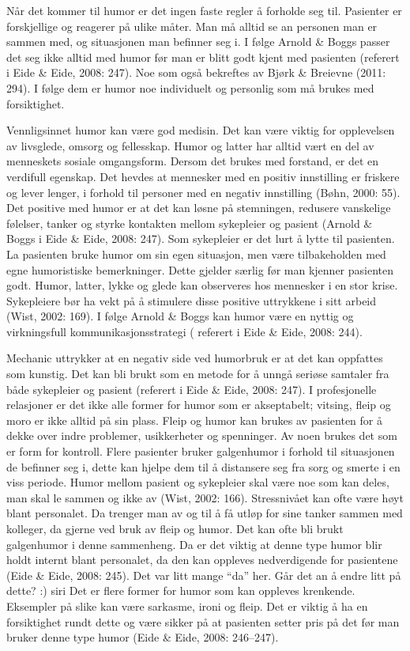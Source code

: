 Når det kommer til humor er det ingen faste regler å forholde seg til.
Pasienter er forskjellige og reagerer på ulike måter. Man må alltid se an
personen man er sammen med, og situasjonen man befinner seg i. I følge Arnold
\&{} Boggs passer det seg ikke alltid med humor før man er blitt godt kjent med
pasienten (referert i Eide \&{} Eide, 2008: 247). Noe som også bekreftes av Bjørk
\&{} Breievne (2011: 294). I følge dem er humor noe individuelt og personlig som
må brukes med forsiktighet.

Vennligsinnet humor kan være god medisin. Det kan være viktig for opplevelsen
av livsglede, omsorg og fellesskap. Humor og latter har alltid vært en del av
menneskets sosiale omgangsform. Dersom det brukes med forstand, er det en
verdifull egenskap. Det hevdes at mennesker med en positiv innstilling er
friskere og lever lenger, i forhold til personer med en negativ innstilling
(Bøhn, 2000: 55). Det positive med humor er at det kan løsne på stemningen,
redusere vanskelige følelser, tanker og styrke kontakten mellom sykepleier og
pasient (Arnold \&{} Boggs i Eide \&{} Eide, 2008: 247). Som sykepleier er det lurt å
lytte til pasienten. La pasienten bruke humor om sin egen situasjon, men være
tilbakeholden med egne humoristiske bemerkninger. Dette gjelder særlig før man
kjenner pasienten godt. Humor, latter, lykke og glede kan observeres hos
mennesker i en stor krise. Sykepleiere bør ha vekt på å stimulere disse
positive uttrykkene i sitt arbeid (Wist, 2002: 169). I følge Arnold \&{} Boggs kan
humor være en nyttig og virkningsfull kommunikasjonsstrategi ( referert i Eide
\&{} Eide, 2008: 244).

Mechanic uttrykker at en negativ side ved humorbruk er at det kan oppfattes som
kunstig. Det kan bli brukt som en metode for å unngå seriøse samtaler fra både
sykepleier og pasient (referert i Eide \&{} Eide, 2008: 247). I profesjonelle
relasjoner er det ikke alle former for humor som er akseptabelt; vitsing, fleip
og moro er ikke alltid på sin plass. Fleip og humor kan brukes av pasienten for
å dekke over indre problemer, usikkerheter og spenninger. Av noen brukes det
som er form for kontroll. Flere pasienter bruker galgenhumor i forhold til
situasjonen de befinner seg i, dette kan hjelpe dem til å distansere seg fra
sorg og smerte i en viss periode. Humor mellom pasient og sykepleier skal være
noe som kan deles, man skal le sammen og ikke av (Wist, 2002: 166).
Stressnivået kan ofte være høyt blant personalet. Da trenger man av og til å få
utløp for sine tanker sammen med kolleger, da gjerne ved bruk av fleip og
humor. Det kan ofte bli brukt galgenhumor i denne sammenheng. Da er det viktig
at denne type humor blir holdt internt blant personalet, da den kan oppleves
nedverdigende for pasientene (Eide \&{} Eide, 2008: 245). Det var litt mange “da”
her. Går det an å endre litt på dette? :) siri Det er flere former for humor
som kan oppleves krenkende. Eksempler på slike kan være sarkasme, ironi og
fleip. Det er viktig å ha en forsiktighet rundt dette og være sikker på at
pasienten setter pris på det før man bruker denne type humor (Eide \&{} Eide,
2008: 246--247).

